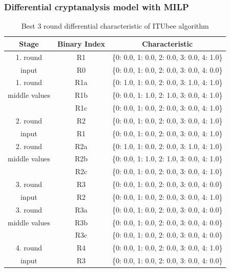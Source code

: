 \documentclass{beamer}
\begin{document}
\begin{frame}
\frametitle{Differential cryptanalysis model with MILP}
\begin{table}[H]
    \footnotesize
    \centering
    \begin{tabular}{|c|c|c|}
        \hline
        \textbf{Stage} & \textbf{Binary Index} & \textbf{Characteristic} \\
        \hline
        1. round  & R1 & \{0: 0.0, 1: 0.0, 2: 0.0, 3: 0.0, 4: 1.0\} \\
        input      & R0 & \{0: 0.0, 1: 0.0, 2: 0.0, 3: 0.0, 4: 0.0\} \\
        \hline
        1. round  & R1a & \{0: 1.0, 1: 0.0, 2: 0.0, 3: 1.0, 4: 1.0\} \\
        middle values   & R1b & \{0: 0.0, 1: 1.0, 2: 1.0, 3: 0.0, 4: 1.0\} \\
                   & R1c & \{0: 0.0, 1: 0.0, 2: 0.0, 3: 0.0, 4: 1.0\} \\
        \hline
        2. round& R2 & \{0: 0.0, 1: 0.0, 2: 0.0, 3: 0.0, 4: 1.0\} \\
        input      & R1 & \{0: 0.0, 1: 0.0, 2: 0.0, 3: 0.0, 4: 1.0\} \\
        \hline
        2. round & R2a & \{0: 1.0, 1: 0.0, 2: 0.0, 3: 1.0, 4: 1.0\} \\
        middle values  & R2b & \{0: 0.0, 1: 1.0, 2: 1.0, 3: 0.0, 4: 1.0\} \\
                   & R2c & \{0: 0.0, 1: 0.0, 2: 0.0, 3: 0.0, 4: 1.0\} \\
        \hline
        3. round  & R3 & \{0: 0.0, 1: 0.0, 2: 0.0, 3: 0.0, 4: 0.0\} \\
        input     & R2 & \{0: 0.0, 1: 0.0, 2: 0.0, 3: 0.0, 4: 1.0\} \\
        \hline
        3. round  & R3a & \{0: 0.0, 1: 0.0, 2: 0.0, 3: 0.0, 4: 0.0\} \\
        middle values   & R3b & \{0: 0.0, 1: 0.0, 2: 0.0, 3: 0.0, 4: 0.0\} \\
                   & R3c & \{0: 0.0, 1: 0.0, 2: 0.0, 3: 0.0, 4: 0.0\} \\
        \hline
        4. round & R4 & \{0: 0.0, 1: 0.0, 2: 0.0, 3: 0.0, 4: 1.0\} \\
        input    & R3 & \{0: 0.0, 1: 0.0, 2: 0.0, 3: 0.0, 4: 0.0\} \\
        \hline
    \end{tabular}
    \caption{Best 3 round differential characteristic of ITUbee algorithm}
    \label{tab:MILPcharDif}
\end{table}

\end{frame}
\end{document}

